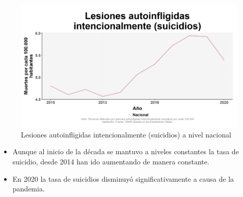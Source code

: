    \begin{figure}[H]
        \caption{Lesiones autoinfligidas intencionalmente (suicidios) a nivel nacional \label{map_result_2} }
        \begin{center}
        \includegraphics[width=\textwidth,keepaspectratio]{img/var_297_trend.png}
        \end{center}
    \end{figure}
            \begin{itemize}
                \item Aunque al inicio de la década se mantuvo a niveles constantes la tasa de suicidio, desde 2014 han ido aumentando de manera constante.
                \item En 2020 la tasa de suicidios disminuyó significativamente a causa de la pandemia.
                \end{itemize}

